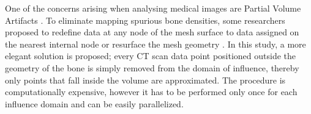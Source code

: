 \documentclass[11pt]{acmeArticle}
\numberwithin{equation}{section}
\begin{document}
One of the concerns arising when analysing medical images are Partial Volume Artifacts \citep{adams2009quantitative}. To eliminate mapping spurious bone densities, some researchers proposed to 
redefine data at any node of the mesh surface to data assigned on the nearest internal node \citep{helgason2008modified, chen2010new} or resurface the mesh geometry \citep{peleg2014can}. In this study, a more elegant solution is proposed; every CT scan data point positioned outside the geometry of the bone is simply removed from the domain of influence, thereby only points that fall inside the volume are approximated. 
The procedure is computationally expensive, however it has to be performed only once for each influence domain and can be easily parallelized. %
\end{document}
